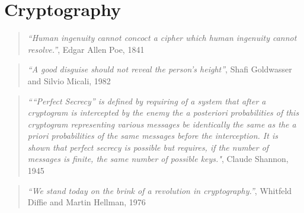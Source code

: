 \chapter{Cryptography}\label{chapcryptography}


\begin{quote}
\emph{``Human ingenuity cannot concoct a cipher which human ingenuity
cannot resolve.''}, Edgar Allen Poe, 1841
\end{quote}

\begin{quote}
\emph{``A good disguise should not reveal the person's height''}, Shafi
Goldwasser and Silvio Micali, 1982
\end{quote}

\begin{quote}
\emph{````Perfect Secrecy'' is defined by requiring of a system that
after a cryptogram is intercepted by the enemy the a posteriori
probabilities of this cryptogram representing various messages be
identically the same as the a priori probabilities of the same messages
before the interception. It is shown that perfect secrecy is possible
but requires, if the number of messages is finite, the same number of
possible keys."}, Claude Shannon, 1945
\end{quote}

\begin{quote}
\emph{``We stand today on the brink of a revolution in cryptography.''},
Whitfeld Diffie and Martin Hellman, 1976
\end{quote}


